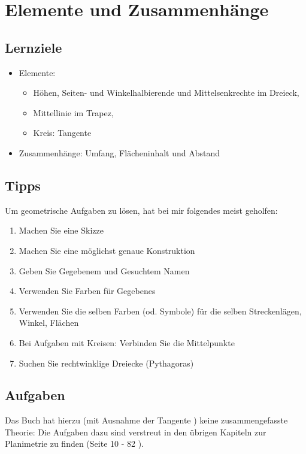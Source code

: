 
\section{Elemente und Zusammenhänge}



\subsection*{Lernziele}

\begin{itemize}
\item Elemente:
  \begin{itemize}
    \item Höhen, Seiten- und Winkelhalbierende und
      Mittelsenkrechte im Dreieck,
    \item Mittellinie im Trapez,
    \item Kreis: Tangente
      \end{itemize}
  \item Zusammenhänge: Umfang, Flächeninhalt und Abstand
\end{itemize}

\subsection{Tipps}
Um geometrische Aufgaben zu lösen, hat bei mir folgendes meist geholfen:

\begin{enumerate}
\item Machen Sie eine Skizze
\item Machen Sie eine möglichst genaue Konstruktion
\item Geben Sie Gegebenem und Gesuchtem Namen
\item Verwenden Sie Farben für Gegebenes
\item Verwenden Sie die selben Farben (od. Symbole) für die selben Streckenlägen, Winkel, Flächen
\item Bei Aufgaben mit Kreisen: Verbinden Sie die Mittelpunkte 
\item Suchen Sie rechtwinklige Dreiecke (Pythagoras)

\end{enumerate}

\subsection*{Aufgaben}
Das Buch hat hierzu (mit Ausnahme der Tangente ) keine zusammengefasste Theorie: Die Aufgaben dazu sind verstreut in den übrigen Kapiteln zur Planimetrie zu finden (Seite 10 - 82 \cite{frommenwiler18geom}).
\newpage

